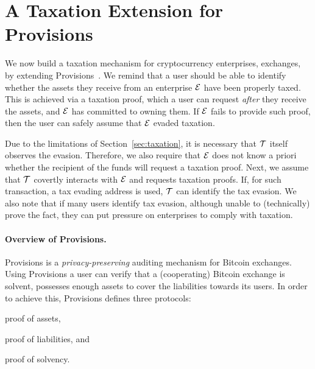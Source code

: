 \section{A Taxation Extension for Provisions}\label{sec:provisions-extension}

We now build a taxation mechanism for cryptocurrency enterprises, \eg
exchanges, by extending Provisions~\cite{CCS:DBBCB15}. We remind that a user
should be able to identify whether the assets they receive from an enterprise
$\mathcal{E}$ have been properly taxed. This is achieved via a taxation proof,
which a user can request \emph{after} they receive the assets, and $\mathcal{E}$
has committed to owning them.  If $\mathcal{E}$ fails to provide such proof, then
the user can safely assume that $\mathcal{E}$ evaded taxation.

Due to the limitations of Section~\ref{sec:taxation}, it is necessary that
$\mathcal{T}$ itself observes the evasion. Therefore, we also require that
$\mathcal{E}$ does not know a priori whether the recipient of the funds will
request a taxation proof.  Next, we assume that $\mathcal{T}$ covertly interacts
with $\mathcal{E}$ and requests taxation proofs. If, for such transaction, a tax
evading address is used, $\mathcal{T}$ can identify the tax evasion. We also note
that if many users identify tax evasion, although unable to (technically) prove
the fact, they can put pressure on enterprises to comply with taxation.


\paragraph{Overview of Provisions.}\label{subsec:provisions-overview}

Provisions is a \emph{privacy-preserving} auditing
mechanism for Bitcoin exchanges. Using Provisions a user can verify that a
(cooperating) Bitcoin exchange is solvent, \ie possesses enough assets to cover
the liabilities towards its users. In order to achieve this, Provisions defines
three protocols:
\begin{inparaenum}[i)]
    \item proof of assets,
    \item proof of liabilities, and
    \item proof of solvency.
\end{inparaenum}

